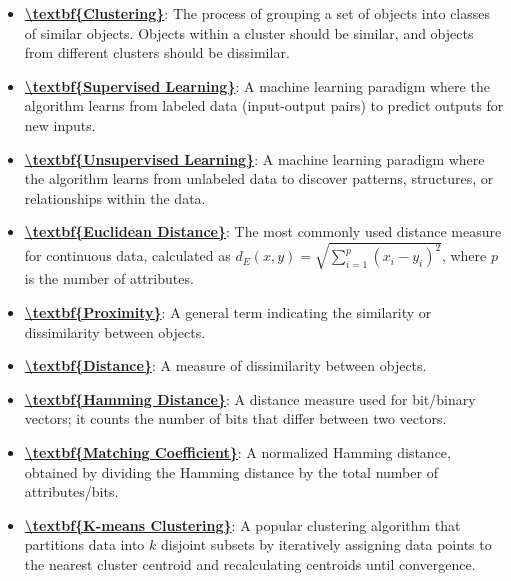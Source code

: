 \documentclass{article}%
\begin{document}
\begin{itemize}[leftmargin=*]%
\item \href{https://www.math.purdue.edu/~yipn/351/12L2-distance-clusters.pdf#page=4}{\textbf{\textbackslash{}textbf\{Clustering\}}}: The process of grouping a set of objects into classes of similar objects. Objects within a cluster should be similar, and objects from different clusters should be dissimilar.%
\item \href{https://www.math.purdue.edu/~yipn/351/12L2-distance-clusters.pdf#page=3}{\textbf{\textbackslash{}textbf\{Supervised Learning\}}}: A machine learning paradigm where the algorithm learns from labeled data (input-output pairs) to predict outputs for new inputs.%
\item \href{https://www.math.purdue.edu/~yipn/351/12L2-distance-clusters.pdf#page=3}{\textbf{\textbackslash{}textbf\{Unsupervised Learning\}}}: A machine learning paradigm where the algorithm learns from unlabeled data to discover patterns, structures, or relationships within the data.%
\item \href{https://www.math.purdue.edu/~yipn/351/12L2-distance-clusters.pdf#page=17}{\textbf{\textbackslash{}textbf\{Euclidean Distance\}}}: The most commonly used distance measure for continuous data, calculated as $d_E(x, y) = \sqrt{\sum_{i=1}^p (x_i - y_i)^2}$, where $p$ is the number of attributes.%
\item \href{https://www.math.purdue.edu/~yipn/351/12L2-distance-clusters.pdf#page=17}{\textbf{\textbackslash{}textbf\{Proximity\}}}: A general term indicating the similarity or dissimilarity between objects.%
\item \href{https://www.math.purdue.edu/~yipn/351/12L2-distance-clusters.pdf#page=17}{\textbf{\textbackslash{}textbf\{Distance\}}}: A measure of dissimilarity between objects.%
\item \href{https://www.math.purdue.edu/~yipn/351/12L2-distance-clusters.pdf#page=19}{\textbf{\textbackslash{}textbf\{Hamming Distance\}}}: A distance measure used for bit/binary vectors; it counts the number of bits that differ between two vectors.%
\item \href{https://www.math.purdue.edu/~yipn/351/12L2-distance-clusters.pdf#page=19}{\textbf{\textbackslash{}textbf\{Matching Coefficient\}}}: A normalized Hamming distance, obtained by dividing the Hamming distance by the total number of attributes/bits.%
\item \href{https://www.math.purdue.edu/~yipn/351/12L2-distance-clusters.pdf#page=21}{\textbf{\textbackslash{}textbf\{K{-}means Clustering\}}}: A popular clustering algorithm that partitions data into $k$ disjoint subsets by iteratively assigning data points to the nearest cluster centroid and recalculating centroids until convergence.%

\end{itemize}
\end{document}
